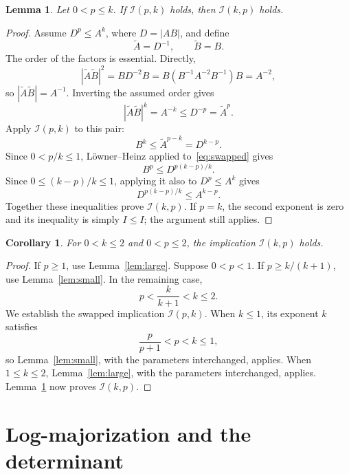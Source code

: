 \documentclass[11pt,a4paper]{article}
\newtheorem{lemma}[theorem]{Lemma}
\newtheorem{corollary}[theorem]{Corollary}
\theoremstyle{remark}
\begin{document}
\begin{lemma}\label{lem:swap}
Let \(0<p\le k\). If \(\mathcal I(p,k)\) holds, then
\(\mathcal I(k,p)\) holds.
\end{lemma}

\begin{proof}
Assume \(D^p\le A^k\), where \(D=|AB|\), and define
\[
 \widetilde A=D^{-1},\qquad \widetilde B=B.
\]
The order of the factors is essential. Directly,
\[
 |\widetilde A\widetilde B|^2
   =BD^{-2}B
   =B(B^{-1}A^{-2}B^{-1})B
   =A^{-2},
\]
so \(|\widetilde A\widetilde B|=A^{-1}\).
Inverting the assumed order gives
\[
 |\widetilde A\widetilde B|^k=A^{-k}
 \le D^{-p}=\widetilde A^p.
\]
Apply \(\mathcal I(p,k)\) to this pair:
\begin{equation}\label{eq:swapped}
 B^k\le \widetilde A^{p-k}=D^{k-p}.
\end{equation}
Since \(0<p/k\le1\), L\"owner--Heinz applied
to~\eqref{eq:swapped} gives
\[
 B^p\le D^{p(k-p)/k}.
\]
Since \(0\le(k-p)/k\le1\), applying it also to \(D^p\le A^k\)
gives
\[
 D^{p(k-p)/k}\le A^{k-p}.
\]
Together these inequalities prove \(\mathcal I(k,p)\).
If \(p=k\), the second exponent is zero and its inequality is
simply \(I\le I\); the argument still applies.
\end{proof}

\begin{corollary}\label{cor:allsmallk}
For \(0<k\le2\) and \(0<p\le2\), the implication
\(\mathcal I(k,p)\) holds.
\end{corollary}

\begin{proof}
If \(p\ge1\), use Lemma~\ref{lem:large}.
Suppose \(0<p<1\). If \(p\ge k/(k+1)\), use
Lemma~\ref{lem:small}. In the remaining case,
\[
 p<\frac{k}{k+1}<k\le2.
\]
We establish the swapped implication \(\mathcal I(p,k)\).
When \(k\le1\), its exponent \(k\) satisfies
\[
 \frac{p}{p+1}<p<k\le1,
\]
so Lemma~\ref{lem:small}, with the parameters interchanged,
applies. When \(1\le k\le2\), Lemma~\ref{lem:large}, with the
parameters interchanged, applies. Lemma~\ref{lem:swap} now proves
\(\mathcal I(k,p)\).
\end{proof}

\section{Log-majorization and the determinant}\label{sec:finish}
\end{document}
